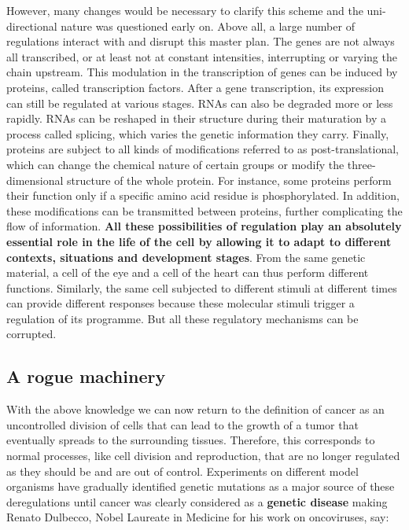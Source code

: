 \documentclass[a4paper,12pt,twoside,onecolumn,openright,final,oldfontcommands]{memoir}
\begin{document}
However, many changes would be necessary to clarify this scheme and the
uni-directional nature was questioned early on. Above all, a large
number of regulations interact with and disrupt this master plan. The
genes are not always all transcribed, or at least not at constant
intensities, interrupting or varying the chain upstream. This modulation
in the transcription of genes can be induced by proteins, called
transcription factors. After a gene transcription, its expression can
still be regulated at various stages. RNAs can also be degraded more or
less rapidly. RNAs can be reshaped in their structure during their
maturation by a process called splicing, which varies the genetic
information they carry. Finally, proteins are subject to all kinds of
modifications referred to as post-translational, which can change the
chemical nature of certain groups or modify the three-dimensional
structure of the whole protein. For instance, some proteins perform
their function only if a specific amino acid residue is phosphorylated.
In addition, these modifications can be transmitted between proteins,
further complicating the flow of information. \textbf{All these
possibilities of regulation play an absolutely essential role in the
life of the cell by allowing it to adapt to different contexts,
situations and development stages}. From the same genetic material, a
cell of the eye and a cell of the heart can thus perform different
functions. Similarly, the same cell subjected to different stimuli at
different times can provide different responses because these molecular
stimuli trigger a regulation of its programme. But all these regulatory
mechanisms can be corrupted.

\subsection{A rogue machinery}\label{a-rogue-machinery}

With the above knowledge we can now return to the definition of cancer
as an uncontrolled division of cells that can lead to the growth of a
tumor that eventually spreads to the surrounding tissues. Therefore,
this corresponds to normal processes, like cell division and
reproduction, that are no longer regulated as they should be and are out
of control. Experiments on different model organisms have gradually
identified genetic mutations as a major source of these deregulations
\citep[\citet{reddy1982point}]{nowell1976clonal} until cancer was
clearly considered as a \textbf{genetic disease} making Renato Dulbecco,
Nobel Laureate in Medicine for his work on oncoviruses, say:
\end{document}
